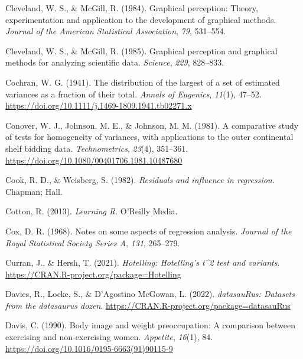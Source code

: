 \documentclass[
  letterpaper,
  10pt,
  krantz2]{krantz}
\newlength{\cslhangindent}
\newlength{\cslentryspacingunit} %
\newenvironment{CSLReferences}[2] %
 {%
  \setlength{\parindent}{0pt}
  \ifodd #1
  \let\oldpar\par
  \def\par{\hangindent=\cslhangindent\oldpar}
  \fi
  \setlength{\parskip}{#2\cslentryspacingunit}
 }%
 {}
\begin{document}
\begin{CSLReferences}{1}{0}
\leavevmode{}%
Cleveland, W. S., \& McGill, R. (1984). Graphical perception: Theory,
experimentation and application to the development of graphical methods.
\emph{Journal of the American Statistical Association}, \emph{79},
531--554.

\leavevmode{}%
Cleveland, W. S., \& McGill, R. (1985). Graphical perception and
graphical methods for analyzing scientific data. \emph{Science},
\emph{229}, 828--833.

\leavevmode{}%
Cochran, W. G. (1941). The distribution of the largest of a set of
estimated variances as a fraction of their total. \emph{Annals of
Eugenics}, \emph{11}(1), 47--52.
\url{https://doi.org/10.1111/j.1469-1809.1941.tb02271.x}

\leavevmode{}%
Conover, W. J., Johnson, M. E., \& Johnson, M. M. (1981). A comparative
study of tests for homogeneity of variances, with applications to the
outer continental shelf bidding data. \emph{Technometrics},
\emph{23}(4), 351--361.
\url{https://doi.org/10.1080/00401706.1981.10487680}

\leavevmode{}%
Cook, R. D., \& Weisberg, S. (1982). \emph{Residuals and influence in
regression}. Chapman; Hall.

\leavevmode{}%
Cotton, R. (2013). \emph{{Learning R}}. O'Reilly Media.

\leavevmode{}%
Cox, D. R. (1968). Notes on some aspects of regression analysis.
\emph{Journal of the Royal Statistical Society Series A}, \emph{131},
265--279.

\leavevmode{}%
Curran, J., \& Hersh, T. (2021). \emph{Hotelling: Hotelling's t\^{}2
test and variants}. \url{https://CRAN.R-project.org/package=Hotelling}

\leavevmode{}%
Davies, R., Locke, S., \& D'Agostino McGowan, L. (2022).
\emph{datasauRus: Datasets from the datasaurus dozen}.
\url{https://CRAN.R-project.org/package=datasauRus}

\leavevmode{}%
Davis, C. (1990). Body image and weight preoccupation: A comparison
between exercising and non-exercising women. \emph{Appetite},
\emph{16}(1), 84. \url{https://doi.org/10.1016/0195-6663(91)90115-9}


\end{CSLReferences}
\end{document}
